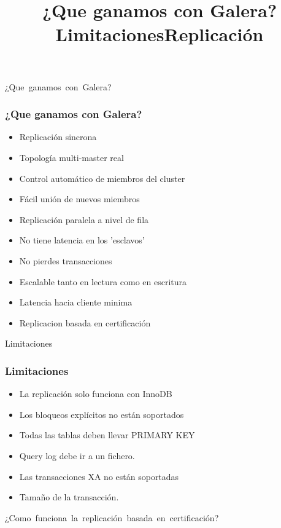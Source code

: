\documentclass[UTF8]{beamer}
\begin{document}
\title[¿Que ganamos?]{¿Que ganamos con Galera?}
\begin{frame}
	\centering
	\mbox{¿Que ganamos con Galera?}	
\end{frame}


\begin{frame}
	\frametitle{¿Que ganamos con Galera?}
	\begin{itemize}
		\item Replicación sincrona
		\pause
		\item Topología multi-master real
		\pause
		\item Control automático de miembros del cluster
		\pause
		\item Fácil unión de nuevos miembros
		\pause
		\item Replicación paralela a nivel de fila
		\pause
		\item No tiene latencia en los 'esclavos'
		\pause
		\item No pierdes transacciones
		\pause
		\item Escalable tanto en lectura como en escritura
		\pause
		\item Latencia hacia cliente minima
		\pause
		\item Replicacion basada en certificación
	\end{itemize}
\end{frame}


\title[Limitaciones]{Limitaciones}
\begin{frame}
	\centering
	\mbox{Limitaciones}	
\end{frame}


\begin{frame}
	\frametitle[Limitaciones]{Limitaciones}
	\begin{itemize}
		\item La replicación solo funciona con InnoDB
		\pause
		\item Los bloqueos explícitos no están soportados
		\pause
		\item Todas las tablas deben llevar PRIMARY KEY
		\pause
		\item Query log debe ir a un fichero.
		\pause
		\item Las transacciones XA no están soportadas
		\pause
		\item Tamaño de la transacción.
	\end{itemize}
\end{frame}


\title[Replicación]{Replicación}
\begin{frame}
	\centering
	\mbox{¿Como funciona la replicación basada en certificación?}	
\end{frame}
\end{document}
